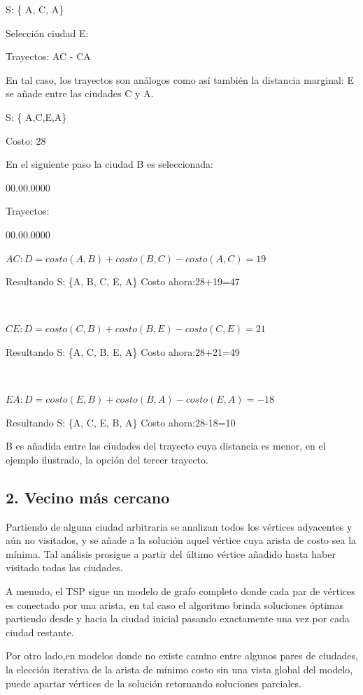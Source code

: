 S: \{ A, C, A\} 

Selección ciudad E: 

Trayectos: AC - CA

En tal caso, los trayectos son análogos como así también la distancia
marginal: E se añade entre las ciudades C y A. 

S: \{ A,C,E,A\} 

Costo: 28 

En el siguiente paso la ciudad B es seleccionada: 
\begin{lyxlist}{00.00.0000}
\item [{Trayectos:}]~

\begin{lyxlist}{00.00.0000}
\item [{$AC:D=costo(A,B)+costo(B,C)-costo(A,C)=19$}]~
\item [{Resultando}] S: \{A, B, C, E, A\} Costo ahora:28+19=47 
\item [{\,}]~
\item [{$CE:D=costo(C,B)+costo(B,E)-costo(C,E)=21$}]~
\item [{Resultando}] S: \{A, C, B, E, A\} Costo ahora:28+21=49
\item [{\,}]~
\item [{$EA:D=costo(E,B)+costo(B,A)-costo(E,A)=-18$}]~
\item [{Resultando}] S: \{A, C, E, B, A\} Costo ahora:28-18=10
\end{lyxlist}
\end{lyxlist}
B es añadida entre las ciudades del trayecto cuya distancia es menor,
en el ejemplo ilustrado, la opción del tercer trayecto.


\subsection*{2. Vecino más cercano}

Partiendo de alguna ciudad arbitraria se analizan todos los vértices
adyacentes y aún no visitados, y se añade a la solución aquel vértice
cuya arista de costo sea la mínima. Tal análisis prosigue a partir
del último vértice añadido hasta haber visitado todas las ciudades. 

A menudo, el \ac{TSP} sigue un modelo de grafo completo donde cada
par de vértices es conectado por una arista, en tal caso el algoritmo
brinda soluciones óptimas partiendo desde y hacia la ciudad inicial
pasando exactamente una vez por cada ciudad restante. 

Por otro lado,en modelos donde no existe camino entre algunos pares
de ciudades, la elección iterativa de la arista de mínimo costo sin
una vista global del modelo, puede apartar vértices de la solución
retornando soluciones parciales. 

